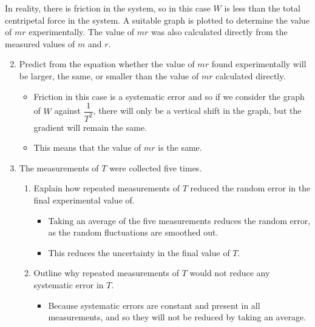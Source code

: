 \documentclass[a4paper,12pt]{article}
\begin{document}
In reality, there is friction in the system, so in this case \( W \) is less than the total centripetal force in
the system. A suitable graph is plotted to determine the value of $mr$ experimentally. The value of
$mr$ was also calculated directly from the measured values of $m$ and $r$.

\begin{enumerate}[label=(\alph*)]
  \setcounter{enumi}{1}
  \item Predict from the equation whether the value of $mr$ found experimentally will be larger, the same, or smaller than the value of $mr$ calculated directly.
        \begin{itemize}
          \item Friction in this case is a systematic error and so if we consider the graph of $W$ against $\dfrac{1}{T^2}$, there will only be a vertical shift in the graph, but the gradient will remain the same.
          \item This means that the value of $mr$ is the same.
        \end{itemize}
  \item
        The measurements of $T$ were collected five times.
        \begin{enumerate}[label=(\roman*)]
          \item Explain how repeated measurements of $T$ reduced the random error in the final experimental value of.
                \begin{itemize}
                  \item Taking an average of the five measurements reduces the random error, as the random fluctuations are smoothed out.
                  \item This reduces the uncertainty in the final value of $T$.
                \end{itemize}
          \item Outline why repeated measurements of $T$ would not reduce any systematic error in $T$.
                \begin{itemize}
                  \item Because systematic errors are constant and present in all measurements, and so they will not be reduced by taking an average.
                \end{itemize}
        \end{enumerate}
\end{enumerate}
\end{document}
